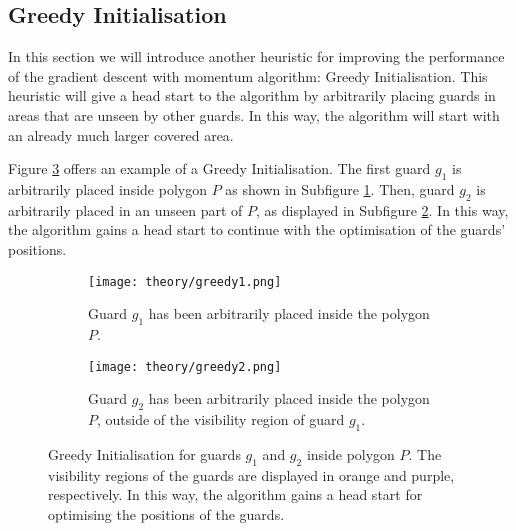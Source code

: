 \subsection{Greedy Initialisation}
\label{sec:greedy}
In this section we will introduce another heuristic for improving the performance of the gradient descent with momentum algorithm: Greedy Initialisation. This heuristic will give a head start to the algorithm by arbitrarily placing guards in areas that are unseen by other guards. In this way, the algorithm will start with an already much larger covered area.

Figure \ref{fig:greedy} offers an example of a Greedy Initialisation. The first guard $g_1$ is arbitrarily placed inside polygon $P$ as shown in Subfigure \ref{fig:greedy1}. Then, guard $g_2$ is arbitrarily placed in an unseen part of $P$, as displayed in Subfigure \ref{fig:greedy2}. In this way, the algorithm gains a head start to continue with the optimisation of the guards' positions.

\begin{figure}[h!]
    \centering
    \begin{subfigure}{0.45\textwidth}
        \texttt{[image: theory/greedy1.png]}
        \caption{Guard $g_1$ has been arbitrarily placed inside the polygon $P$.}
        \label{fig:greedy1}
    \end{subfigure}
    \hfill
    \begin{subfigure}{0.45\textwidth}
        \texttt{[image: theory/greedy2.png]}
        \caption{Guard $g_2$ has been arbitrarily placed inside the polygon $P$, outside of the visibility region of guard $g_1$.}
        \label{fig:greedy2}
    \end{subfigure}
    \caption{Greedy Initialisation for guards $g_1$ and $g_2$ inside polygon $P$. The visibility regions of the guards are displayed in orange and purple, respectively. In this way, the algorithm gains a head start for optimising the positions of the guards.}
    \label{fig:greedy}
\end{figure}

